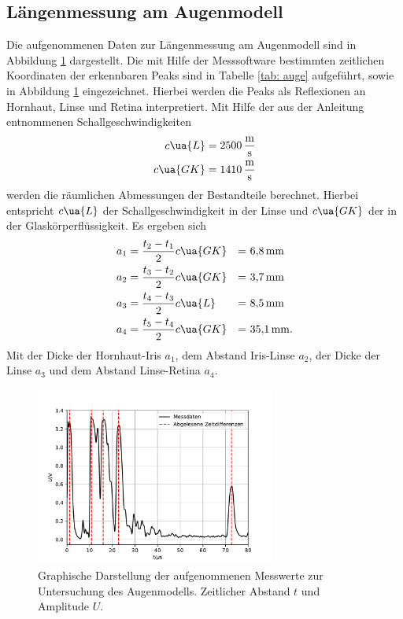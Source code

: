 \subsection{Längenmessung am Augenmodell}
Die aufgenommenen Daten zur Längenmessung am Augenmodell sind in Abbildung \ref{fig: auge} dargestellt. Die mit Hilfe
der Messsoftware bestimmten zeitlichen Koordinaten der erkennbaren Peaks sind in Tabelle \ref{tab: auge} aufgeführt, sowie in Abbildung
\ref{fig: auge} eingezeichnet. Hierbei werden die Peaks als Reflexionen an Hornhaut, Linse und Retina interpretiert.
Mit Hilfe der aus der Anleitung \cite{anleitungus1} entnommenen Schallgeschwindigkeiten
\begin{align}
  \begin{aligned}
    c\ua{L} &= \SI{2500}{\meter\per\second}\\
    c\ua{GK}&= \SI{1410}{\meter\per\second}
  \end{aligned}
\end{align}
werden die räumlichen Abmessungen der Bestandteile berechnet. Hierbei entspricht $c\ua{L}$ der Schallgeschwindigkeit
in der Linse und $c\ua{GK}$ der in der Glaskörperflüssigkeit. Es ergeben sich
\begin{align}
  \begin{aligned}
a_1 &= \frac{t_2 - t_1}{2} c\ua{GK} &=&\,\, \SI[]{6.8}{\milli\meter} \\
a_2 &= \frac{t_3 - t_2}{2} c\ua{GK} &=&\,\, \SI[]{3.7}{\milli\meter}\\
a_3 &= \frac{t_4 - t_3}{2} c\ua{L}  &=&\,\, \SI[]{8.5}{\milli\meter}\\
a_4 &= \frac{t_5 - t_4}{2} c\ua{GK} &=&\,\,\SI[]{35.1}{\milli\meter}.
\end{aligned}
\end{align}
Mit der Dicke der Hornhaut-Iris $a_1$, dem Abstand Iris-Linse $a_2$,
der Dicke der Linse $a_3$ und dem Abstand Linse-Retina $a_4$.

\begin{figure}[H]
  \centering
  \includegraphics[width = 0.7\textwidth]{../Messdaten/plots/auge.pdf}
  \caption{Graphische Darstellung der aufgenommenen Messwerte zur Untersuchung des Augenmodells. Zeitlicher Abstand $t$ und Amplitude $U$.}
  \label{fig: auge}
\end{figure}

